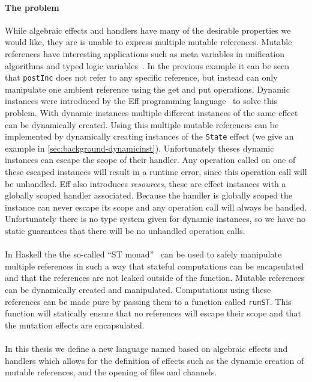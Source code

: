 \paragraph{The problem}
While algebraic effects and handlers have many of the desirable properties we would like, they are is unable to express multiple mutable references.
Mutable references have interesting applications such as meta variables in unification algorithms and typed logic variables~\autocite{typedlogic}.
In the previous example it can be seen that \texttt{postInc} does not refer to any specific reference, but instead can only manipulate one ambient reference using the get and put operations.
Dynamic instances were introduced by the Eff programming language~\autocite{eff1} to solve this problem.
With dynamic instances multiple different instances of the same effect can be dynamically created.
Using this multiple mutable references can be implemented by dynamically creating instances of the \texttt{State} effect (we give an example in \cref{sec:background-dynamicinst}).
Unfortunately theses dynamic instances can escape the scope of their handler.
Any operation called on one of these escaped instances will result in a runtime error, since this operation call will be unhandled.
Eff also introduces \emph{resources}, these are effect instances with a globally scoped handler associated.
Because the handler is globally scoped the instance can never escape its scope and any operation call will always be handled.
Unfortunately there is no type system given for dynamic instances, so we have no static guarantees that there will be no unhandled operation calls.
\\\\
In Haskell the the so-called ``ST monad''~\autocite{runst} can be used to safely manipulate multiple references in such a way that stateful computations can be encapsulated and that the references are not leaked outside of the function.
Mutable references can be dynamically created and manipulated.
Computations using these references can be made pure by passing them to a function called \texttt{runST}.
This function will statically ensure that no references will escape their scope and that the mutation effects are encapsulated.
\\\\
In this thesis we define a new language named \lang{} based on algebraic effects and handlers which allows for the definition of effects such as the dynamic creation of mutable references, and the opening of files and channels.
